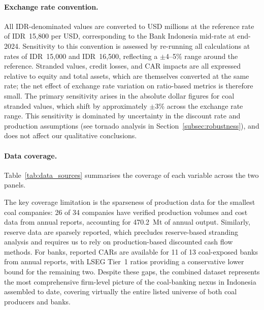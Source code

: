 \paragraph{Exchange rate convention.} All IDR-denominated values are converted to USD millions at the reference rate of IDR~15,800 per USD, corresponding to the Bank Indonesia mid-rate at end-2024. Sensitivity to this convention is assessed by re-running all calculations at rates of IDR~15,000 and IDR~16,500, reflecting a $\pm$4--5\% range around the reference. Stranded values, credit losses, and CAR impacts are all expressed relative to equity and total assets, which are themselves converted at the same rate; the net effect of exchange rate variation on ratio-based metrics is therefore small. The primary sensitivity arises in the absolute dollar figures for coal stranded values, which shift by approximately $\pm$3\% across the exchange rate range. This sensitivity is dominated by uncertainty in the discount rate and production assumptions (see tornado analysis in Section~\ref{subsec:robustness}), and does not affect our qualitative conclusions.

\paragraph{Data coverage.} Table~\ref{tab:data_sources} summarises the coverage of each variable across the two panels.



The key coverage limitation is the sparseness of production data for the smallest coal companies: 26 of 34 companies have verified production volumes and cost data from annual reports, accounting for 470.2~Mt of annual output. Similarly, reserve data are sparsely reported, which precludes reserve-based stranding analysis and requires us to rely on production-based discounted cash flow methods. For banks, reported CARs are available for 11 of 13 coal-exposed banks from annual reports, with LSEG Tier~1 ratios providing a conservative lower bound for the remaining two. Despite these gaps, the combined dataset represents the most comprehensive firm-level picture of the coal-banking nexus in Indonesia assembled to date, covering virtually the entire listed universe of both coal producers and banks.
